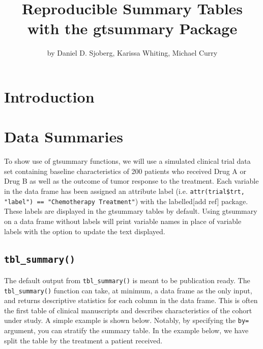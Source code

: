 \title{Reproducible Summary Tables with the gtsummary Package}
\author{by Daniel D. Sjoberg, Karissa Whiting, Michael Curry}

\maketitle


\section{Introduction}

\section{Data Summaries}

To show use of gtsummary functions, we will use a simulated clinical trial data set containing baseline characteristics of 200 patients who received Drug A or Drug B as well as the outcome of tumor response to the treatment.
Each variable in the data frame has been assigned an attribute label (i.e. \texttt{attr(trial\$trt, "label") == "Chemotherapy Treatment"}) with the labelled[add ref] package. 
These labels are displayed in the {gtsummary} tables by default. Using {gtsummary} on a data frame without labels will print variable names in place of variable labels with the option to update the text displayed.



\subsection{\texorpdfstring{\texttt{tbl\_summary()}}{tbl\_summary()}}

The default output from \texttt{tbl\_summary()} is meant to be publication ready.
The \texttt{tbl\_summary()} function can take, at minimum, a data frame as the only input, and returns descriptive statistics for each column in the data frame.
This is often the first table of clinical manuscripts and describes characteristics of the cohort under study.
A simple example is shown below.
Notably, by specifying the \texttt{by=} argument, you can stratify the summary table. 
In the example below, we have split the table by the treatment a patient received. 

